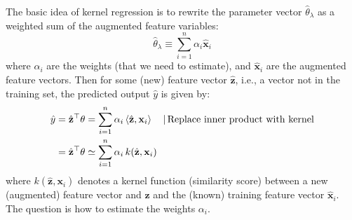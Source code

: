 \documentclass{article}[11pt]
\begin{document}
The basic idea of kernel regression is to rewrite the parameter vector $\hat{\theta}_{\lambda}$ 
as a weighted sum of the augmented feature variables: 
\begin{equation}
\hat{\theta}_{\lambda} \equiv \sum_{i=1}^{n}\alpha_{i}\hat{\mathbf{x}}_{i}
\end{equation}
where $\alpha_{i}$ are the weights (that we need to estimate), and $\hat{\mathbf{x}}_{i}$ are the augmented feature vectors.
Then for some (new) feature vector $\hat{\mathbf{z}}$, i.e., a vector not in the training set, the predicted output $\hat{y}$ is given by:
\begin{align*}
\hat{y} & = \hat{\mathbf{z}}^{\top}\theta = \sum_{i=1}^{n}\alpha_{i}\left<\hat{\mathbf{z}},\mathbf{x}_{i}\right>\quad\text{|\,Replace inner product with kernel}\\
        & = \hat{\mathbf{z}}^{\top}\theta \simeq \sum_{i=1}^{n}\alpha_{i}\,k(\hat{\mathbf{z}},\mathbf{x}_{i})
\end{align*}
where $k(\hat{\mathbf{z}},\mathbf{x}_{i})$ denotes a kernel function (similarity score) between a new (augmented) feature vector and $\hat{\mathbf{z}}$
and the (known) training feature vector $\hat{\mathbf{x}}_{i}$. The question is how to estimate the weights $\alpha_{i}$.
\end{document}
